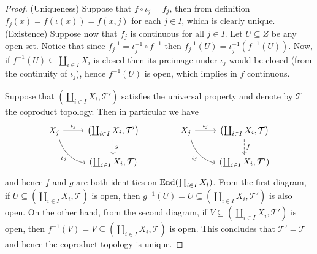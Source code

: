 \begin{proof}
  (Uniqueness) Suppose that \(f \circ \iota_j = f_j\), then from definition
  \(f_j(x) = f(\iota(x)) = f(x, j)\) for each \(j \in I\), which is clearly
  unique.
  (Existence) Suppose now that \(f_j\) is continuous for all \(j \in I\). Let
  \(U \subseteq Z\) be any open set. Notice that since \(f_j^{-1} = \iota_j^{-1}
  \circ f^{-1}\) then \(f_j^{-1}(U) = \iota_j^{-1}(f^{-1}(U))\). Now, if
  \(f^{-1}(U) \subseteq \coprod_{i \in I} X_i\) is closed then its preimage
  under \(\iota_j\) would be closed (from the continuity of \(\iota_j\)), hence
  \(f^{-1}(U)\) is open, which implies in \(f\) continuous.

  Suppose that \((\coprod_{i \in I} X_i, \mathcal T')\) satisfies the universal
  property and denote by \(\mathcal T\) the coproduct topology. Then in
  particular we have
  \[
    \begin{tikzcd}
      X_j \ar[r, "\iota_j"] \ar[rd, bend right, swap, "\iota_j"]
        &\left( \coprod_{i \in I} X_i, \mathcal T' \right)
        \ar[d, dashed, "g"] \\
        &(\coprod_{i \in I} X_i, \mathcal T)
    \end{tikzcd}
    \qquad \qquad
    \begin{tikzcd}
      X_j \ar[r, "\iota_j"] \ar[rd, bend right, swap, "\iota_j"]
        &\left( \coprod_{i \in I} X_i, \mathcal T \right)
        \ar[d, dashed, "f"] \\
        &(\coprod_{i \in I} X_i, \mathcal T')
    \end{tikzcd}
  \] 
  and hence \(f\) and \(g\) are both identities on \(\operatorname{End}(\coprod_{i \in I}
  X_i)\). From the first diagram, if \(U \subseteq (\coprod_{i \in I} X_i,
  \mathcal T)\) is open, then \(g^{-1}(U) = U \subseteq (\coprod_{i \in I} X_i,
  \mathcal T')\) is also open. On the other hand, from the second diagram, if
  \(V \subseteq (\coprod_{i \in I} X_i, \mathcal T')\) is open, then \(f^{-1}(V)
  = V \subseteq (\coprod_{i \in I} X_i, \mathcal T)\) is open. This concludes
  that \(\mathcal T' = \mathcal T\) and hence the coproduct topology is unique.
\end{proof}

